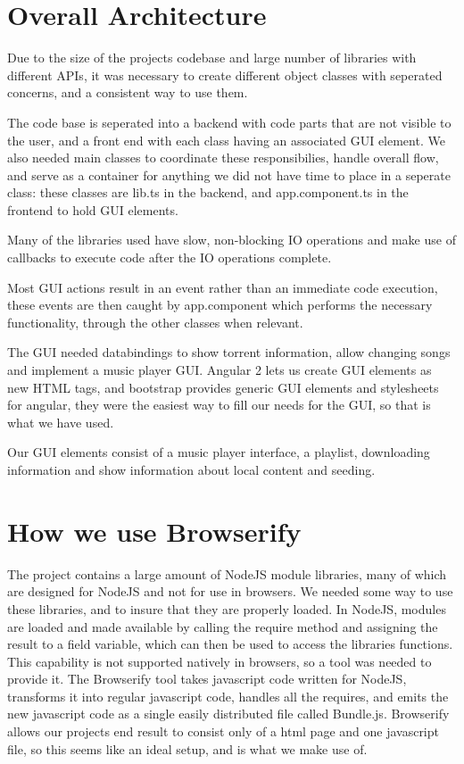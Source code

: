 \section{Overall Architecture}
Due to the size of the projects codebase and large number of libraries with different \acs{API}s, 
it was necessary to create different object classes with seperated concerns,
and a consistent way to use them.

The code base is seperated into a backend with code parts that are not visible to the user,
and a front end with each class having an associated \acs{GUI} element.
We also needed main classes to coordinate these responsibilies, handle overall flow,
and serve as a container for anything we did not have time to place in a seperate class:
these classes are lib.ts in the backend,
and app.component.ts in the frontend to hold \acs{GUI} elements.

Many of the libraries used have slow, non-blocking IO operations
and make use of callbacks to execute code after the IO operations complete.

Most \acs{GUI} actions result in an event rather than an immediate code execution, 
these events are then caught by app.component
which performs the necessary functionality, through the other classes when relevant.
\newline

The \acs{GUI} needed databindings to show torrent information, allow changing songs
and implement a music player \acs{GUI}. 
Angular 2 lets us create \acs{GUI} elements as new \acs{HTML} tags, 
and bootstrap provides generic \acs{GUI} elements and stylesheets for angular, 
they were the easiest way to fill our needs for the \acs{GUI},
so that is what we have used.

Our \acs{GUI} elements consist of a music player interface, a playlist, downloading information 
and show information about local content and seeding.
\newline

\section{How we use Browserify}
The project contains a large amount of NodeJS module libraries, 
many of which are designed for NodeJS and not for use in browsers.
We needed some way to use these libraries, and to insure that they are properly loaded.
In NodeJS, modules are loaded and made available by calling the require method 
and assigning the result to a field variable, which can then be used to access the libraries functions.
This capability is not supported natively in browsers, so a tool was needed to provide it.
The Browserify tool takes javascript code written for NodeJS, 
transforms it into regular javascript code, 
handles all the requires, 
and emits the new javascript code as a single easily distributed file called Bundle.js.
Browserify allows our projects end result to consist only of a html page and one javascript file, 
so this seems like an ideal setup, and is what we make use of.
\newline


